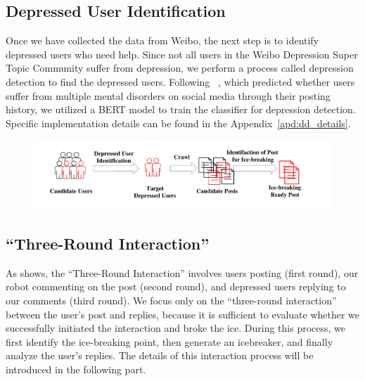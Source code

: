 \subsection{Depressed User Identification} 
\label{sec:depression_detection}
Once we have collected the data from Weibo, the next step is to identify depressed users who need help. Since not all users in the Weibo Depression Super Topic Community suffer from depression, we perform a process called depression detection to find the depressed users.
Following ~\citet{zhang2022symptom}, which predicted whether users suffer from multiple mental disorders on social media through their posting history, we utilized a BERT model \cite{devlin2018bert} to train the classifier for depression detection. Specific implementation details can be found in the Appendix~\ref{apd:dd_details}.
\begin{figure}[th]
	\centering
	\includegraphics[width=1.7\columnwidth]{images/pipeline1.pdf}
	\caption{}
\label{fig:pipeline1}
\end{figure}

\subsection{``Three-Round Interaction''}
\label{sec:3round}
As  shows, the ``Three-Round Interaction'' involves users posting (first round), our robot commenting on the post (second round), and depressed users replying to our comments (third round).
We focus only on the ``three-round interaction'' between the user’s post and replies, because it is sufficient to evaluate whether we successfully initiated the interaction and broke the ice. 
During this process, we first identify the ice-breaking point, then generate an icebreaker, and finally analyze the user's replies. The details of this interaction process will be introduced in the following part.

